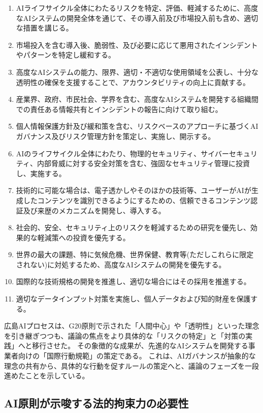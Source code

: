 \begin{enumerate}
  \item AIライフサイクル全体にわたるリスクを特定、評価、軽減するために、高度なAIシステムの開発全体を通じて、その導入前及び市場投入前も含め、適切な措置を講じる。
  \item 市場投入を含む導入後、脆弱性、及び必要に応じて悪用されたインシデントやパターンを特定し緩和する。
  \item 高度なAIシステムの能力、限界、適切・不適切な使用領域を公表し、十分な透明性の確保を支援することで、アカウンタビリティの向上に貢献する。
  \item 産業界、政府、市民社会、学界を含む、高度なAIシステムを開発する組織間での責任ある情報共有とインシデントの報告に向けて取り組む。
  \item 個人情報保護方針及び緩和策を含む、リスクベースのアプローチに基づくAIガバナンス及びリスク管理方針を策定し、実施し、開示する。
  \item AIのライフサイクル全体にわたり、物理的セキュリティ、サイバーセキュリティ、内部脅威に対する安全対策を含む、強固なセキュリティ管理に投資し、実施する。
  \item 技術的に可能な場合は、電子透かしやそのほかの技術等、ユーザーがAIが生成したコンテンツを識別できるようにするための、信頼できるコンテンツ認証及び来歴のメカニズムを開発し、導入する。
  \item 社会的、安全、セキュリティ上のリスクを軽減するための研究を優先し、効果的な軽減策への投資を優先する。
  \item 世界の最大の課題、特に気候危機、世界保健、教育等(ただしこれらに限定されない)に対処するため、高度なAIシステムの開発を優先する。
  \item 国際的な技術規格の開発を推進し、適切な場合にはその採用を推進する。
  \item 適切なデータインプット対策を実施し、個人データおよび知的財産を保護する。
\end{enumerate}

広島AIプロセスは、G20原則で示された「人間中心」や「透明性」といった理念を引き継ぎつつも、議論の焦点をより具体的な「リスクの特定」と「対策の実践」へと移行させた。
その象徴的な成果が、先進的なAIシステムを開発する事業者向けの「国際行動規範」の策定である。
これは、AIガバナンスが抽象的な理念の共有から、具体的な行動を促すルールの策定へと、議論のフェーズを一段進めたことを示している。

\subsection{AI原則が示唆する法的拘束力の必要性}

